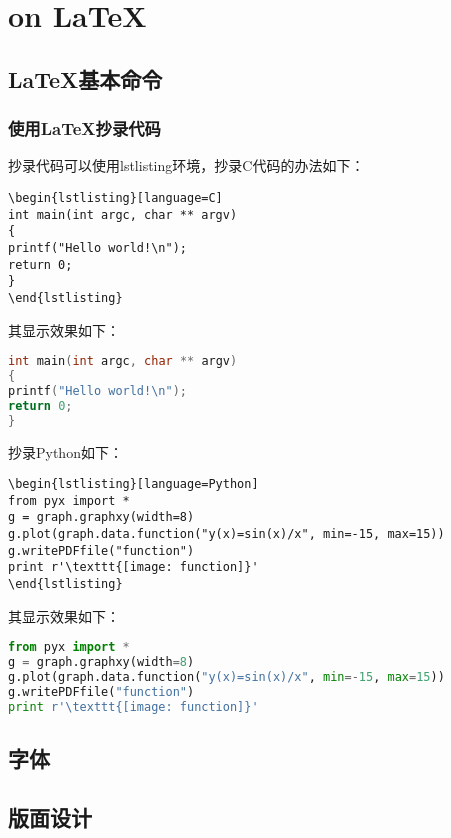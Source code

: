 \chapter{on \LaTeX}

\section{\LaTeX{}基本命令}

\subsection{使用\LaTeX{}抄录代码}
抄录代码可以使用lstlisting环境，抄录C代码的办法如下：
\begin{verbatim}
\begin{lstlisting}[language=C]
int main(int argc, char ** argv)
{
printf("Hello world!\n");
return 0;
}
\end{lstlisting}
\end{verbatim}

\noindent{}其显示效果如下：
\begin{lstlisting}[language=C]
int main(int argc, char ** argv)
{
printf("Hello world!\n");
return 0;
}
\end{lstlisting}


\noindent{}抄录Python如下：
\begin{verbatim}
\begin{lstlisting}[language=Python]
from pyx import *
g = graph.graphxy(width=8)
g.plot(graph.data.function("y(x)=sin(x)/x", min=-15, max=15))
g.writePDFfile("function")
print r'\texttt{[image: function]}'
\end{lstlisting}
\end{verbatim}

\noindent{}其显示效果如下：
\begin{lstlisting}[language=Python]
from pyx import *
g = graph.graphxy(width=8)
g.plot(graph.data.function("y(x)=sin(x)/x", min=-15, max=15))
g.writePDFfile("function")
print r'\texttt{[image: function]}'
\end{lstlisting}


\section{字体}


\section{版面设计}


